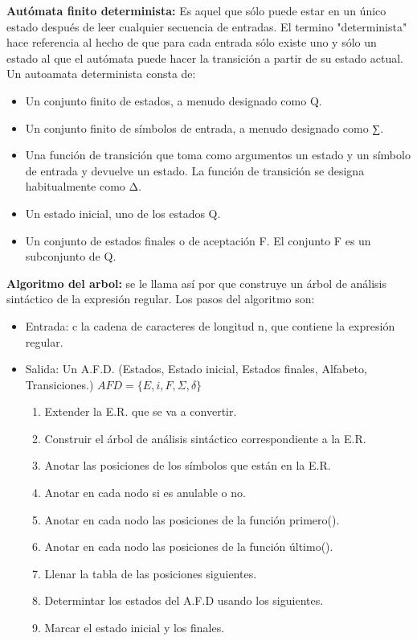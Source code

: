 \documentclass{book}
\begin{document}
{\bf Autómata finito determinista:} Es aquel que sólo puede estar en un único estado después de leer cualquier secuencia de entradas. El termino "determinista" hace referencia al hecho de que para cada entrada sólo existe uno y sólo un estado al que el autómata puede hacer la transición a partir de su estado actual. Un autoamata determinista consta de:

\begin{itemize}
	\item Un conjunto finito de estados, a menudo designado como Q.
	\item Un conjunto finito de símbolos de entrada, a menudo designado como ∑.
	\item Una función de transición que toma como argumentos un estado y un símbolo de entrada y devuelve un estado. La función de transición se designa habitualmente como Δ.
	\item Un estado inicial, uno de los estados Q.
	\item Un conjunto de estados finales o de aceptación F. El conjunto F es un  subconjunto de Q.
\end{itemize}

{\bf Algoritmo del arbol:} se le llama así por que construye un árbol de análisis sintáctico de la expresión regular. Los pasos del algoritmo son:

\begin{itemize}
	\item Entrada: c la cadena de caracteres de longitud n, que contiene la expresión regular.
	\item Salida: Un A.F.D. (Estados, Estado inicial, Estados finales, Alfabeto, Transiciones.) $AFD=\{E,i,F,\Sigma,\delta\}$
\begin{enumerate}
		\item Extender la E.R. que se va a convertir.
		\item Construir el árbol de análisis sintáctico correspondiente a la E.R.
		\item Anotar las posiciones de los símbolos que están en la E.R.
		\item Anotar en cada nodo si es anulable o no.
		\item Anotar en cada nodo las posiciones de la función primero().
		\item Anotar en cada nodo las posiciones de la función último().
		\item Llenar la tabla de las posiciones siguientes.
		\item Determintar los estados del A.F.D usando los siguientes.
		\item Marcar el estado inicial y los finales.
\end{enumerate}
\end{itemize}
\end{document}
